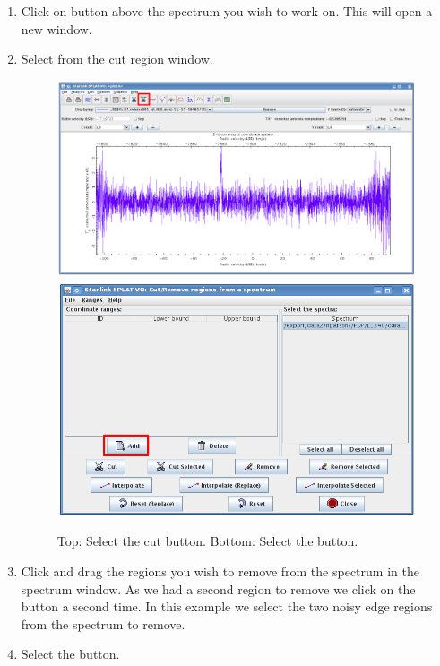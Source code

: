 \documentclass[11pt,oneside,chapters]{starlink}
\begin{document}
\begin{enumerate}[label=(\textbf{\arabic*})]

\item Click on  button
above the spectrum you wish to work on. This will open a new window.


\item Select  from the cut region window.

\begin{figure}[h!]
\begin{center}
\includegraphics[width=0.7\linewidth]{sc20_splat_tocut_spectrum}
\includegraphics[width=0.65\linewidth]{sc20_splat_cutregion_blank}
\caption[Select the crop button in SPLAT.]{\label{fig:splat_crop1}
  Top: Select the cut button. Bottom: Select the  button.}
\end{center}
\end{figure}


\item Click and drag the regions you wish to remove from the
spectrum in the spectrum window. As we had a
second region to remove we click on the  button
a second time. In this example we select the two noisy edge regions from the
spectrum to remove.


\item Select the  button.


\end{enumerate}
\end{document}
